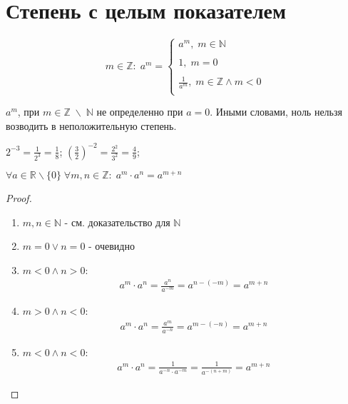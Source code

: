 \section{Степень с целым показателем}

\begin{definition}
    \[
        m \in \mathbb{Z}: \; a^m = 
        \left\{
        \begin{array}{l}
            a^m, \; m \in \mathbb{N} \\ \\
            1, \; m = 0 \\ \\
            \frac{1}{a^m}, \; m \in  \mathbb{Z} \land m < 0 \\
        \end{array}\right.
    \]
\end{definition}

\begin{remark}
    $a^m$, при $m \in \mathbb{Z} \; \backslash \; \mathbb{N}$ не определенно при $a = 0$. Иными словами, ноль нельзя возводить в неположительную степень.
\end{remark}

\begin{example}
    $2^{-3} = \frac{1}{2^3} = \frac{1}{8}$; $(\frac{3}{2})^{-2} = \frac{2^2}{3^2} = \frac{4}{9}$;
\end{example}

\begin{theorem}
    $\forall a \in \mathbb{R} \backslash \{0\} \; \forall m, n \in \mathbb{Z}: \; a^m \cdot a^n = a^{m + n}$
\end{theorem}

\begin{proof}
    \hfill

    \begin{enumerate}
        \item $m,n \in \mathbb{N}$ - см. доказательство для $\mathbb{N}$
        \item $m = 0 \lor n = 0$ - очевидно
        \item $m < 0 \land n > 0$:
        \begin{align*}
            a^m \cdot a^n = \frac{a^n}{a^{-m}} = a^{n - (-m)} = a^{m + n}
        \end{align*}
        \item $m > 0 \land n < 0$:
        \begin{align*}
            a^m \cdot a^n = \frac{a^m}{a^{-n}} = a^{m - (-n)} = a^{m + n}
        \end{align*}
        \item $m < 0 \land n < 0$:
        \begin{align*}
            a^m \cdot a^n = \frac{1}{a^{-n} \cdot a^{-m}} = \frac{1}{a^{-(n+m)}} = a^{m + n}
        \end{align*}
    \end{enumerate}
\end{proof}

